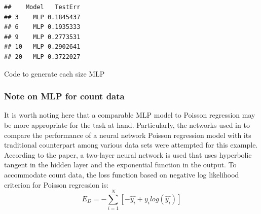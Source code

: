 \documentclass[
]{article}
\newenvironment{Shaded}{\begin{snugshade}}{\end{snugshade}}
\newcommand{\AttributeTok}[1]{\textcolor[rgb]{0.77,0.63,0.00}{#1}}
\newcommand{\CommentTok}[1]{\textcolor[rgb]{0.56,0.35,0.01}{\textit{#1}}}
\newcommand{\DecValTok}[1]{\textcolor[rgb]{0.00,0.00,0.81}{#1}}
\newcommand{\FloatTok}[1]{\textcolor[rgb]{0.00,0.00,0.81}{#1}}
\newcommand{\FunctionTok}[1]{\textcolor[rgb]{0.00,0.00,0.00}{#1}}
\newcommand{\NormalTok}[1]{#1}
\newcommand{\OtherTok}[1]{\textcolor[rgb]{0.56,0.35,0.01}{#1}}
\newcommand{\SpecialCharTok}[1]{\textcolor[rgb]{0.00,0.00,0.00}{#1}}
\newcommand{\StringTok}[1]{\textcolor[rgb]{0.31,0.60,0.02}{#1}}
\begin{document}
\begin{Shaded}
\end{Shaded}

\begin{verbatim}
##    Model   TestErr
## 3    MLP 0.1845437
## 6    MLP 0.1935333
## 9    MLP 0.2773531
## 10   MLP 0.2902641
## 20   MLP 0.3722027
\end{verbatim}

Code to generate each size MLP

\hypertarget{note-on-mlp-for-count-data}{%
\subsubsection{Note on MLP for count
data}\label{note-on-mlp-for-count-data}}

It is worth noting here that a comparable MLP model to Poisson
regression may be more appropriate for the task at hand. Particularly,
the networks used in \cite{fallah2009nonlinear} to compare the
performance of a neural network Poisson regression model with its
traditional counterpart among various data sets were attempted for this
example. According to the paper, a two-layer neural network is used that
uses hyperbolic tangent in the hidden layer and the exponential function
in the output. To accommodate count data, the loss function based on
negative log likelihood criterion for Poisson regression is: \[
E_D = - \sum_{i=1}^N \left[ -\hat{y_i} + y_i log(\hat{y_i}) \right]
\]
\end{document}
